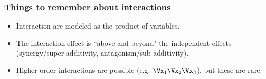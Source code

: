 \documentclass{beamer}
\begin{document}
\begin{frame}
\frametitle{Things to remember about interactions}

\begin{itemize}
	\item Interaction are modeled as the product of variables.
	\item The interaction effect is ``above and beyond" the independent effects (synergy/super-additivity, antagonism/sub-additivity).
	\item Higher-order interactions are possible (e.g. $\Vx_1\Vx_2\Vx_3$), but these are rare.
\end{itemize}
\end{frame}
\end{document}

